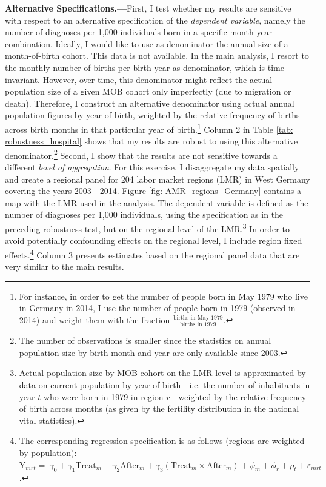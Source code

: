 \documentclass[11pt, a4paper]{article} %
\begin{document}
\textbf{Alternative Specifications.---}First, I test whether my results are sensitive with respect to an alternative specification of the \textit{dependent variable}, namely the number of diagnoses per 1,000 individuals born in a specific month-year combination. Ideally, I would like to use as denominator the annual size of a month-of-birth cohort. This data is not available. In the main analysis, I resort to the monthly number of births per birth year as denominator, which is time-invariant. However, over time, this denominator might reflect the actual population size of a given MOB cohort only imperfectly (due to migration or death). Therefore, I construct an alternative denominator using actual annual population figures by year of birth, weighted by the relative frequency of births across birth months in that particular year of birth.\footnote{For instance, in order to get the number of people born in May 1979 who live in Germany in 2014, I use the number of people born in 1979 (observed in 2014) and weight them with the fraction $\frac{\text{births in May 1979}}{\text{births in 1979}}$.} Column 2 in Table \ref{tab: robustness_hospital} shows that my results are robust to using this alternative denominator.\footnote{The number of observations is smaller since the statistics on annual population size by birth month and year are only available since 2003.} Second, I show that the results are not sensitive towards a different \textit{level of aggregation}. For this exercise, I disaggregate my data spatially and create a regional panel for 204 labor market regions (LMR) in West Germany covering the years 2003 - 2014. Figure \ref{fig: AMR_regions_Germany} contains a map with the LMR used in the analysis. The dependent variable is defined as the number of diagnoses per 1,000 individuals, using the specification as in the preceding robustness test, but on the regional level of the LMR.\footnote{Actual population size by MOB cohort on the LMR level is approximated by data on current population by year of birth - i.e. the number of inhabitants in year $t$ who were born in 1979 in region $r$ - weighted by the relative frequency of birth across months (as given by the fertility distribution in the national vital statistics).} In order to avoid potentially confounding effects on the regional level, I include region fixed effects.\footnote{The corresponding regression specification is as follows (regions are weighted by population):\newline $\text{Y}_{mrt} =\ \gamma_0 + \gamma_1 \text{Treat}_{m} + \gamma_2 \text{After}_{m} + \gamma_3 (\text{Treat}_{m} \times \text{After}_{m}) + \psi_m + \phi_r + \rho_t + \varepsilon_{mrt} \label{eq:DD_LMR}$.} Column 3 presents estimates based on the regional panel data that are very similar to the main results. \newline
\end{document}
